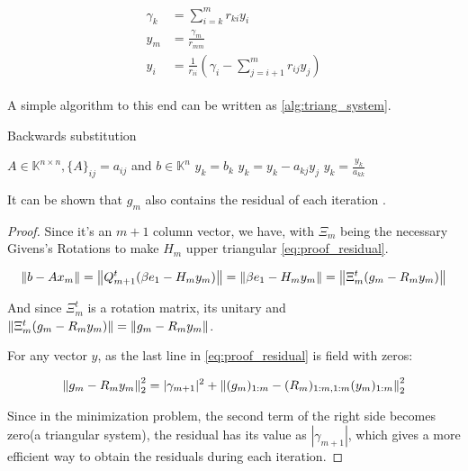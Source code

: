 \begin{align}\label{eq:triangular_system}
    \begin{split}
        \gamma_{k} &= \sum_{i=k}^{m} r_{ki} y_{i}\\
        y_{m} &= \frac{\gamma_{m}}{r_{mm}} \\
        y_{i} &= \frac{1}{r_{ii}} \left( \gamma_{i} - \sum_{j=i+1}^{m} r_{ij} y_{j}  \right)
    \end{split}
\end{align}

A simple algorithm to this end can be written as \ref{alg:triang_system}.

\begin{algorithm}
    \caption{Backwards substitution}\label{alg:triang_system}
    \begin{algorithmic}[1]
        \State $A \in \mathbb{K}^{n \times n}, \{ A \}_{ij} = a_{ij}$ and $b\in \mathbb{K}^{n}$
        \State $y_{k} = b_{k}$
        \State $y_{k} = y_{k} - a_{kj}y_{j}$
        \EndFor
        \State $y_{k} = \frac{y_{k}}{a_{kk}}$
        \EndFor
    \end{algorithmic}
\end{algorithm}



It can be shown that $g_{m}$ also contains the residual of each iteration \cite{saad2003iterative}.

\begin{proof}

    Since it's an $m+1$ column vector, we have, with $\Xi_{m}$ being the necessary Givens's Rotations to make $H_{m}$ upper triangular \ref{eq:proof_residual}.


    \begin{equation}\label{eq:proof_residual}
        \left\lVert b - Ax_{m}\right\rVert = \left\lVert Q_{m+1}^{t}(\beta e_{1} - H_{m}y_{m})\right\rVert = \left\lVert\beta e_{1} - H_{m}y_{m}\right\rVert = \left\lVert\Xi_{m}^{t} (g_{m} - R_{m}y_{m})\right\rVert
    \end{equation}

    And since $\Xi_{m}^{t}$ is a rotation matrix, its unitary and $\left\lVert\Xi_{m}^{t} (g_{m} - R_{m}y_{m})\right\rVert=\left\lVert g_{m} - R_{m}y_{m}\right\rVert$.

    For any vector $y$, as the last line in \ref{eq:proof_residual} is field with zeros:

    \begin{equation}
        \left\lVert g_{m} - R_{m}y_{m}\right\rVert_{2}^{2} = |\gamma_{m+1}|^{2} + \left\lVert(g_{m})_{1:m} - (R_{m})_{1:m,1:m} (y_{m})_{1:m}\right\rVert_{2}^{2}
    \end{equation}

    Since in the minimization problem, the second term of the right side becomes zero(a triangular system), the residual has its value as $|\gamma_{m+1}|$, which gives a more efficient way to obtain the residuals during each iteration.
\end{proof}

